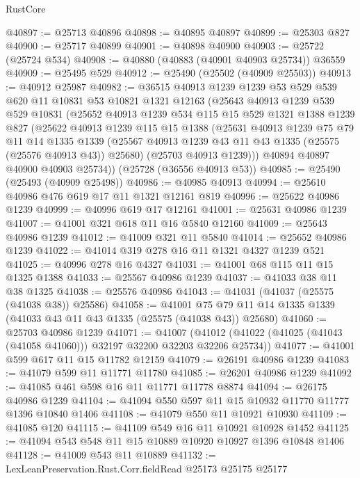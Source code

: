 \begin{lexlean}{RustCore}
\begin{coremodule}
@40897 := @25713 @40896
@40898 := @40895 @40897
@40899 := @25303 @827
@40900 := @25717 @40899
@40901 := @40898 @40900
@40903 := @25722 (@25724 @534)
@40908 := @40880 (@40883 (@40901 @40903 @25734)) @36559
@40909 := @25495 @529
@40912 := @25490 (@25502 (@40909 @25503))
@40913 := @40912 @25987
@40982 := @36515
    @40913
    @1239
    @1239
    @53
    @529
    @539
    @620
    @11
    @10831
    @53
    @10821
    @1321
    @12163
    (@25643
      @40913
      @1239
      @539
      @529
      @10831
      (@25652
        @40913
        @1239
        @534
        @115
        @15
        @529
        @1321
        @1388
        @1239
        @827
        (@25622
          @40913
          @1239
          @115
          @15
          @1388
          (@25631
            @40913
            @1239
            @75
            @79
            @11
            @14
            @1335
            @1339
            (@25567 @40913 @1239 @43 @11 @43 @1335 (@25575 (@25576 @40913 @43)) @25680)
            (@25703 @40913 @1239)))
        @40894
        @40897
        @40900
        @40903
        @25734))
    (@25728 (@36556 @40913 @53))
@40985 := @25490 (@25493 (@40909 @25498))
@40986 := @40985 @40913
@40994 := @25610 @40986 @476 @619 @17 @11 @1321 @12161 @819
@40996 := @25622 @40986 @1239
@40999 := @40996 @619 @17 @12161
@41001 := @25631 @40986 @1239
@41007 := @41001 @321 @618 @11 @16 @5840 @12160
@41009 := @25643 @40986 @1239
@41012 := @41009 @321 @11 @5840
@41014 := @25652 @40986 @1239
@41022 := @41014 @319 @278 @16 @11 @1321 @4327 @1239 @521
@41025 := @40996 @278 @16 @4327
@41031 := @41001 @68 @115 @11 @15 @1325 @1388
@41033 := @25567 @40986 @1239
@41037 := @41033 @38 @11 @38 @1325
@41038 := @25576 @40986
@41043 := @41031 (@41037 (@25575 (@41038 @38)) @25586)
@41058 := @41001 @75 @79 @11 @14 @1335 @1339 (@41033 @43 @11 @43 @1335 (@25575 (@41038 @43)) @25680)
@41060 := @25703 @40986 @1239
@41071 := @41007
    (@41012 (@41022 (@41025 (@41043 (@41058 @41060))) @32197 @32200 @32203 @32206 @25734))
@41077 := @41001 @599 @617 @11 @15 @11782 @12159
@41079 := @26191 @40986 @1239
@41083 := @41079 @599 @11 @11771 @11780
@41085 := @26201 @40986 @1239
@41092 := @41085 @461 @598 @16 @11 @11771 @11778 @8874
@41094 := @26175 @40986 @1239
@41104 := @41094 @550 @597 @11 @15 @10932 @11770 @11777 @1396 @10840 @1406
@41108 := @41079 @550 @11 @10921 @10930
@41109 := @41085 @120
@41115 := @41109 @549 @16 @11 @10921 @10928 @1452
@41125 := @41094 @543 @548 @11 @15 @10889 @10920 @10927 @1396 @10848 @1406
@41128 := @41009 @543 @11 @10889
@41132 := LexLeanPreservation.Rust.Corr.fieldRead @25173 @25175 @25177

\end{coremodule}
\end{lexlean}
